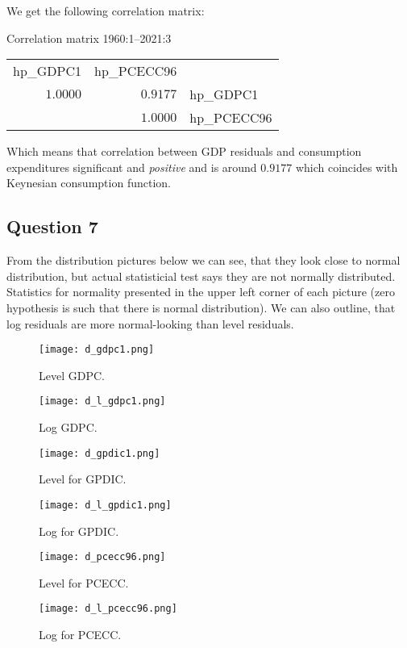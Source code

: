 \documentclass[11pt, oneside]{article}
\begin{document}
We get the following correlation matrix: 
\begin{center}
	Correlation matrix
	 1960:1--2021:3\\
	\vspace{8pt}
	\begin{tabular}{rrl}
		hp\_GDPC1 & hp\_PCECC96 &\\
		$1.0000$ & $0.9177$ & hp\_GDPC1\\
		& $1.0000$ & hp\_PCECC96\\
	\end{tabular}
	
\end{center}

Which means that correlation between GDP residuals and consumption expenditures significant and \textit{positive} and is around $ 0.9177 $ which coincides with Keynesian consumption function.


\subsection*{Question 7}

From the distribution pictures below we can see, that they look close to normal distribution, but actual statisticial test says they are not normally distributed. Statistics for normality presented in the upper left corner of each picture (zero hypothesis is such that there is normal distribution). We can also outline, that log residuals are more normal-looking than level residuals.

\begin{figure}[!hbtp]
	\centering
	\begin{minipage}[b]{0.48\textwidth}
		\texttt{[image: d\_gdpc1.png]}
		\caption{Level GDPC.}
	\end{minipage}
	\hfill
	\begin{minipage}[b]{0.48\textwidth}
		\texttt{[image: d\_l\_gdpc1.png]}
		\caption{Log GDPC.}
	\end{minipage}
	\begin{minipage}[b]{0.48\textwidth}
	\texttt{[image: d\_gpdic1.png]}
	\caption{Level for GPDIC.}
\end{minipage}
\hfill
\begin{minipage}[b]{0.48\textwidth}
	\texttt{[image: d\_l\_gpdic1.png]}
	\caption{Log for GPDIC.}
\end{minipage}

		\centering 
\begin{minipage}[b]{0.48\textwidth}
	\texttt{[image: d\_pcecc96.png]}
	\caption{Level for PCECC.}
\end{minipage}
\hfill
\begin{minipage}[b]{0.48\textwidth}
	\texttt{[image: d\_l\_pcecc96.png]}
	\caption{Log for PCECC.}
\end{minipage}
\end{figure}
\end{document}
